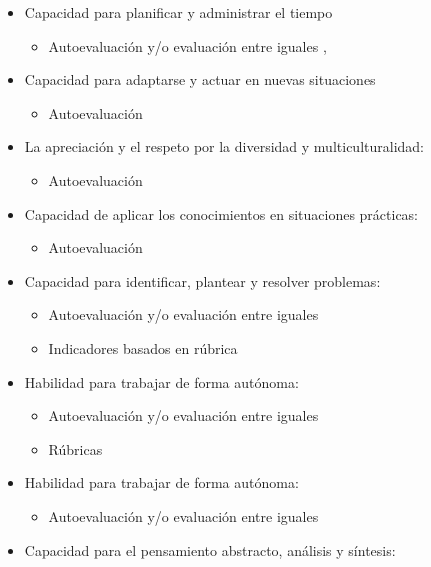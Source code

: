 \begin{itemize}
\begin{itemize}
	\end{itemize}
\item Capacidad para planificar y administrar el tiempo
	\begin{itemize} 
	\item Autoevaluación y/o evaluación entre iguales \cite{Achcaoucaou:2012}, \cite{Liao:2013}
	\end{itemize}
\item Capacidad para adaptarse y actuar en nuevas situaciones
	\begin{itemize} 
	\item Autoevaluación \cite{Liao:2013}
	\end{itemize}
\item La apreciación y el respeto por la diversidad y multiculturalidad:
	\begin{itemize} 
	\item Autoevaluación \cite{Liao:2013}
	\end{itemize}
\item Capacidad de aplicar los conocimientos en situaciones prácticas:
	\begin{itemize} 
	\item Autoevaluación \cite{Liao:2013}
	\end{itemize}
\item Capacidad para identificar, plantear y resolver problemas:
	\begin{itemize} 
	\item Autoevaluación y/o evaluación entre iguales \cite{Achcaoucaou:2012}
	\item Indicadores basados en rúbrica \cite{Guenaga:2013}
	\end{itemize}
\item Habilidad para trabajar de forma autónoma:
	\begin{itemize} 
	\item Autoevaluación y/o evaluación entre iguales \cite{Colomo-Palacios:2013}
	\item Rúbricas \cite{Palomares:2011}
	\end{itemize} 
\item Habilidad para trabajar de forma autónoma:
	\begin{itemize} 
	\item Autoevaluación y/o evaluación entre iguales \cite{Colomo-Palacios:2013}
	\end{itemize} 
\item Capacidad para el pensamiento abstracto, análisis y síntesis:
	\begin{itemize} 

\end{itemize}
\end{itemize}
